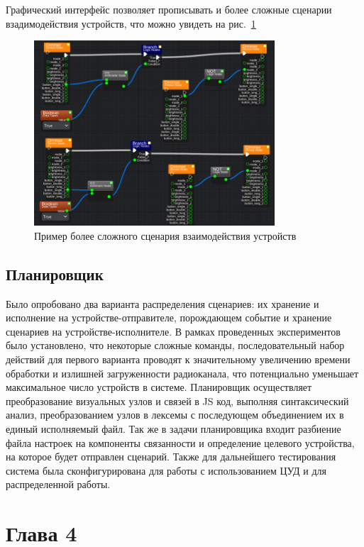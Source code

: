 \documentclass[a4paper,12pt]{article}
\begin{document}
Графический интерфейс позволяет прописывать и более сложные сценарии взадимодействия устройств, что можно увидеть на рис.~\ref{fig:GUI_adv}

\begin{figure}[h]
    \centering
    \includegraphics[width=0.8\textwidth]{images/Fig12.png}
    \caption{Пример более сложного сценария взаимодействия устройств}
    \label{fig:GUI_adv}
\end{figure}

\subsection{Планировщик}
Было опробовано два варианта распределения сценариев: их хранение и исполнение на устройстве-отправителе, порождающем событие и хранение сценариев на устройстве-исполнителе. В рамках проведенных экспериментов было установлено, что некоторые сложные команды, последовательный набор действий для первого варианта проводят к значительному увеличению времени обработки и излишней загруженности радиоканала, что потенциально уменьшает максимальное число устройств в системе.
Планировщик осуществляет преобразование визуальных узлов и связей в JS код, выполняя синтаксический анализ, преобразованием узлов в лексемы с последующем объединением их в единый исполняемый файл. Так же в задачи планировщика входит разбиение файла настроек на компоненты связанности и определение целевого устройства, на которое будет отправлен сценарий.
Также для дальнейшего тестирования система была сконфигурирована для работы с использованием ЦУД и для распределенной работы.

\newpage

\section{Глава 4}
\end{document}
